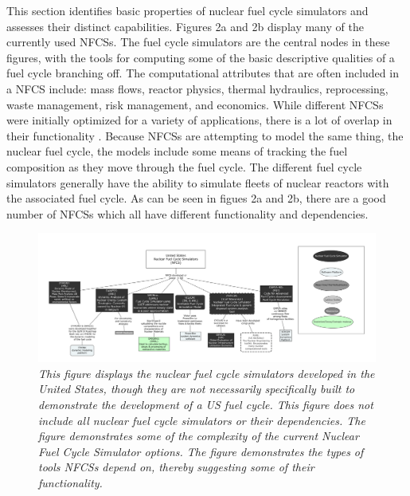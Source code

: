 \documentclass{article}                                                                           %
\begin{document}
\begin{linenumbers}
This section identifies basic properties of nuclear fuel cycle simulators and assesses their distinct capabilities. Figures 2a and 2b display many of the currently used NFCSs. The fuel cycle simulators are the central nodes in these figures, with the tools for computing some of the basic descriptive qualities of a fuel cycle branching off. The computational attributes that are often included in a NFCS include: mass flows, reactor physics, thermal hydraulics, reprocessing, waste management, risk management, and economics. While different NFCSs were initially optimized for a variety of applications, there is a lot of overlap in their functionality \cite {Guerin2009}. Because NFCSs are attempting to model the same thing, the nuclear fuel cycle, the models include some means of tracking the fuel composition as they move through the fuel cycle. The different fuel cycle simulators generally have the ability to simulate fleets of nuclear reactors with the associated fuel cycle. As can be seen in figues 2a and 2b, there are a good number of NFCSs which all have different functionality and dependencies.

\begin{subfigures}
\begin{figure}
\includegraphics[width=\textwidth]{US_FUEL_TOOLS.png}
\caption{\small \sl This figure displays the nuclear fuel cycle simulators developed in the United States, though they are not necessarily specifically built to demonstrate the development of a US fuel cycle. This figure does not include all nuclear fuel cycle simulators or their dependencies.  The figure demonstrates some of the complexity of the current Nuclear Fuel Cycle Simulator options. The figure demonstrates the types of tools NFCSs depend on, thereby suggesting some of their functionality.}
\end{figure}


\end{subfigures}
\end{linenumbers}
\end{document}
